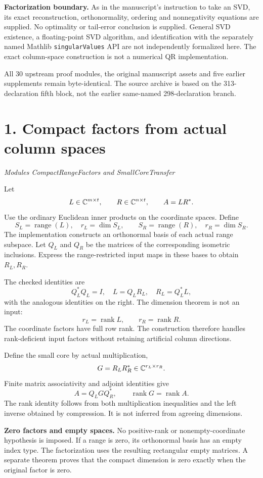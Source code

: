 \documentclass[11pt]{article}
\newcommand{\rank}{\operatorname{rank}}
\newcommand{\pageheading}[2]{\section*{\color{ink}#1}\textit{#2}\par}
\begin{document}
\textbf{Factorization boundary.} As in the manuscript's instruction to take an SVD, its exact reconstruction, orthonormality, ordering and nonnegativity equations are supplied. No optimality or tail-error conclusion is supplied. General SVD existence, a floating-point SVD algorithm, and identification with the separately named Mathlib \texttt{singularValues} API are not independently formalized here. The exact column-space construction is not a numerical QR implementation.

All 30 upstream proof modules, the original manuscript assets and five earlier supplements remain byte-identical. The source archive is based on the 313-declaration fifth block, not the earlier same-named 298-declaration branch.

\newpage
\pageheading{1. Compact factors from actual column spaces}{Modules CompactRangeFactors and SmallCoreTransfer}
Let
\[
L\in\mathbb C^{m\times t},\qquad R\in\mathbb C^{n\times t},\qquad A=LR^*.
\]
Use the ordinary Euclidean inner products on the coordinate spaces. Define
\[
S_L=\operatorname{range}(L),\quad r_L=\dim S_L,
\qquad S_R=\operatorname{range}(R),\quad r_R=\dim S_R.
\]
The implementation constructs an orthonormal basis of each actual range subspace. Let $Q_L$ and $Q_R$ be the matrices of the corresponding isometric inclusions. Express the range-restricted input maps in these bases to obtain $R_L,R_R$.

The checked identities are
\[
\boxed{Q_L^*Q_L=I,\quad L=Q_LR_L,\quad R_L=Q_L^*L,}
\]
with the analogous identities on the right. The dimension theorem is not an input:
\[
\boxed{r_L=\rank L,\qquad r_R=\rank R.}
\]
The coordinate factors have full row rank. The construction therefore handles rank-deficient input factors without retaining artificial column directions.

Define the small core by actual multiplication,
\[
G=R_LR_R^*\in\mathbb C^{r_L\times r_R}.
\]
Finite matrix associativity and adjoint identities give
\[
\boxed{A=Q_LGQ_R^*,\qquad \rank G=\rank A.}
\]
The rank identity follows from both multiplication inequalities and the left inverse obtained by compression. It is not inferred from agreeing dimensions.

\textbf{Zero factors and empty spaces.} No positive-rank or nonempty-coordinate hypothesis is imposed. If a range is zero, its orthonormal basis has an empty index type. The factorization uses the resulting rectangular empty matrices. A separate theorem proves that the compact dimension is zero exactly when the original factor is zero.
\end{document}
